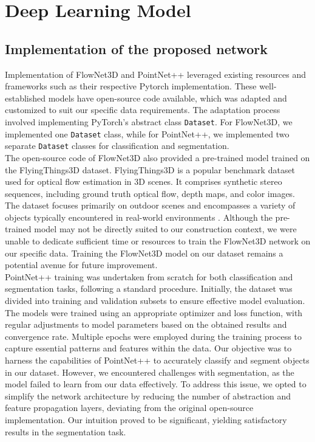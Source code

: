 \section{Deep Learning Model}
\subsection{Implementation of the proposed network}

Implementation of FlowNet3D\cite{FlowNet3D} and PointNet++\cite{PointNet3D} leveraged existing resources and frameworks such as their respective Pytorch implementation. These well-established models have open-source code available, which was adapted and customized to suit our specific data requirements. The adaptation process involved implementing PyTorch's abstract class \texttt{Dataset}. For FlowNet3D, we implemented one \texttt{Dataset} class, while for PointNet++, we implemented two separate \texttt{Dataset} classes for classification and segmentation.\\

The open-source code of FlowNet3D also provided a pre-trained model trained on the FlyingThings3D dataset. FlyingThings3D is a popular benchmark dataset used for optical flow estimation in 3D scenes. It comprises synthetic stereo sequences, including ground truth optical flow, depth maps, and color images. The dataset focuses primarily on outdoor scenes and encompasses a variety of objects typically encountered in real-world environments \cite{flyingthings}. Although the pre-trained model may not be directly suited to our construction context, we were unable to dedicate sufficient time or resources to train the FlowNet3D network on our specific data. Training the FlowNet3D model on our dataset remains a potential avenue for future improvement.\\

PointNet++ training was undertaken from scratch for both classification and segmentation tasks, following a standard procedure. Initially, the dataset was divided into training and validation subsets to ensure effective model evaluation. The models were trained using an appropriate optimizer and loss function, with regular adjustments to model parameters based on the obtained results and convergence rate. Multiple epochs were employed during the training process to capture essential patterns and features within the data. Our objective was to harness the capabilities of PointNet++ to accurately classify and segment objects in our dataset. However, we encountered challenges with segmentation, as the model failed to learn from our data effectively. To address this issue, we opted to simplify the network architecture by reducing the number of abstraction and feature propagation layers, deviating from the original open-source implementation. Our intuition proved to be significant, yielding satisfactory results in the segmentation task.

